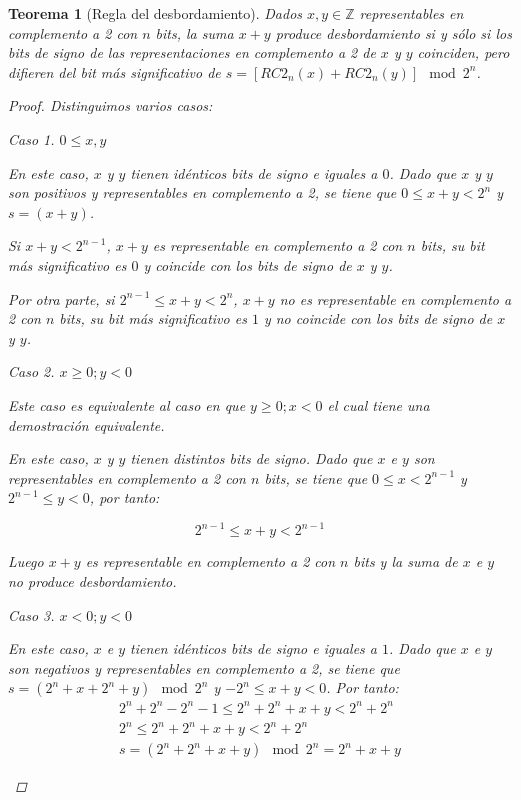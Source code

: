 \documentclass[spanish,a4paper,12pt,titlepage]{article}
\newtheorem{theorem}{Teorema}%
\theoremstyle{definition}
\theoremstyle{remark}
\newtheorem{case}{Caso}
\newcommand{\bbZ}{\mathbb{Z}}
\begin{document}
\begin{theorem}[Regla del desbordamiento]\label{theorem-overflow-law}
  Dados $x, y \in \bbZ$ representables en complemento a 2 con $n$ bits, la suma $x+y$ produce desbordamiento si y sólo si los bits de signo de las representaciones en complemento a 2 de $x$ y $y$ coinciden, pero difieren del bit más significativo de $s = [RC2_n(x)+RC2_n(y)] \mod 2^n$.
  \begin{proof}
    Distinguimos varios casos:

    \begin{case}
      $0 \le x,y$

      En este caso, $x$ y $y$ tienen idénticos bits de signo e iguales a $0$. Dado que $x$ y $y$ son positivos y representables en complemento a 2, se tiene que $0 \le x+y < 2^n$ y $s = (x + y)$.

      Si $x+y < 2^{n-1}$, $x+y$ es representable en complemento a 2 con $n$ bits, su bit más significativo es $0$ y coincide con los bits de signo de $x$ y $y$.

      Por otra parte, si $2^{n-1} \le x+y < 2^n$, $x+y$ no es representable en complemento a 2 con $n$ bits, su bit más significativo es $1$ y no coincide con los bits de signo de $x$ y $y$.
    \end{case}

    \begin{case}
      $x \ge 0; y < 0$

      Este caso es equivalente al caso en que $y \ge 0; x < 0$ el cual tiene una demostración equivalente.

      En este caso, $x$ y $y$ tienen distintos bits de signo. Dado que $x$ e $y$ son representables en complemento a 2 con $n$ bits, se tiene que $0 \le x < 2^{n-1}$ y $2^{n-1} \le y < 0$, por tanto:

      \[
        2^{n-1} \le x + y < 2^{n-1}
      \]

      Luego $x+y$ es representable en complemento a 2 con $n$ bits y la suma de $x$ e $y$ no produce desbordamiento.
    \end{case}

    \begin{case}
      $x < 0; y < 0$

      En este caso, $x$ e $y$ tienen idénticos bits de signo e iguales a $1$. Dado que $x$ e $y$ son negativos y representables en complemento a 2, se tiene que $s = (2^n + x + 2^n + y) \mod 2^n$ y $-2^n \le x+y < 0$. Por tanto:
      \begin{align*}
        2^n + 2^n - 2^n-1 \le 2^n + 2^n + x + y < 2^n + 2^n\\
        2^n \le 2^n + 2^n + x + y < 2^n + 2^n\\
        s = (2^n + 2^n + x + y) \mod 2^n = 2^n + x + y
      \end{align*}


\end{case}
\end{proof}
\end{theorem}
\end{document}
